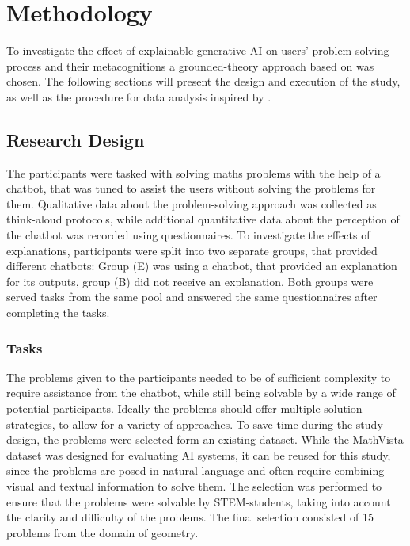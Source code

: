 \section{Methodology} \label{sec:methodology}

To investigate the effect of explainable generative \ac{AI} on users' problem-solving process and their metacognitions a grounded-theory approach based on \cite{Gioia2013} was chosen. The following sections will present the design and execution of the study, as well as the procedure for data analysis inspired by \cite{Jussupow2021}.

\subsection{Research Design} \label{ssec:research_design}

The participants were tasked with solving maths problems with the help of a chatbot, that was tuned to assist the users without solving the problems for them. Qualitative data about the problem-solving approach was collected as think-aloud protocols, while additional quantitative data about the perception of the chatbot was recorded using questionnaires. To investigate the effects of explanations, participants were split into two separate groups, that provided different chatbots: Group (E) was using a chatbot, that provided an explanation for its outputs, group (B) did not receive an explanation. Both groups were served tasks from the same pool and answered the same questionnaires after completing the tasks.

\subsubsection{Tasks} \label{sssec:tasks}

The problems given to the participants needed to be of sufficient complexity to require assistance from the chatbot, while still being solvable by a wide range of potential participants. Ideally the problems should offer multiple solution strategies, to allow for a variety of approaches. To save time during the study design, the problems were selected form an existing dataset. While the MathVista dataset \parencite{MathVista2024} was designed for evaluating \ac{AI} systems, it can be reused for this study, since the problems are posed in natural language and often require combining visual and textual information to solve them. The selection was performed to ensure that the problems were solvable by \acs{STEM}-students, taking into account the clarity and difficulty of the problems. The final selection consisted of 15 problems from the domain of geometry.

